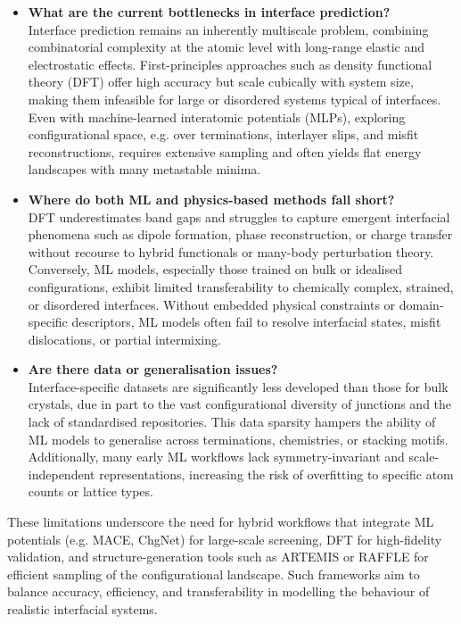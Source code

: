 \begin{itemize}
    \item \textbf{What are the current bottlenecks in interface prediction?} \\
    Interface prediction remains an inherently multiscale problem, combining combinatorial complexity at the atomic level
    with long-range elastic and electrostatic effects. First-principles approaches such as density functional theory
    (DFT) offer high accuracy but scale cubically with system size, making them infeasible for large or disordered
    systems typical of interfaces. Even with machine-learned interatomic potentials (MLPs), exploring configurational
    space, e.g. over terminations, interlayer slips, and misfit reconstructions, requires extensive sampling and often
    yields flat energy landscapes with many metastable minima.

    \item \textbf{Where do both ML and physics-based methods fall short?} \\
    DFT underestimates band gaps and struggles to capture emergent interfacial phenomena such as dipole formation, phase
    reconstruction, or charge transfer without recourse to hybrid functionals or many-body perturbation theory.
    Conversely, ML models, especially those trained on bulk or idealised configurations, exhibit limited transferability
    to chemically complex, strained, or disordered interfaces. Without embedded physical constraints or domain-specific
    descriptors, ML models often fail to resolve interfacial states, misfit dislocations, or partial intermixing.

    \item \textbf{Are there data or generalisation issues?} \\
    Interface-specific datasets are significantly less developed than those for bulk crystals, due in part to the vast
    configurational diversity of junctions and the lack of standardised repositories. This data sparsity hampers the
    ability of ML models to generalise across terminations, chemistries, or stacking motifs. Additionally, many early ML
    workflows lack symmetry-invariant and scale-independent representations, increasing the risk of overfitting to
    specific atom counts or lattice types.
\end{itemize}

These limitations underscore the need for hybrid workflows that integrate ML potentials (e.g. MACE, ChgNet) for
large-scale screening, DFT for high-fidelity validation, and structure-generation tools such as ARTEMIS or RAFFLE for
efficient sampling of the configurational landscape. Such frameworks aim to balance accuracy, efficiency, and
transferability in modelling the behaviour of realistic interfacial systems.

